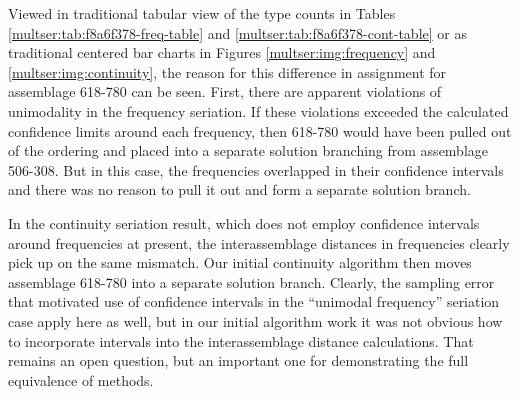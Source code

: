 Viewed in traditional tabular view of the type counts in Tables
\ref{multser:tab:f8a6f378-freq-table} and \ref{multser:tab:f8a6f378-cont-table} or as
traditional centered bar charts in Figures \ref{multser:img:frequency} and
\ref{multser:img:continuity}, the reason for this difference in assignment for assemblage 618-780 can be seen. First, there are
apparent violations of unimodality in the frequency seriation.  If these violations exceeded the calculated confidence limits around each frequency, then 618-780 would have been pulled out of the ordering and placed into a separate solution branching from assemblage 506-308.  But in this case, the frequencies overlapped in their confidence intervals and there was no reason to pull it out and form a separate solution branch.

In the continuity seriation result, which does not employ confidence intervals around frequencies at present, the interassemblage distances in frequencies clearly pick up on the same mismatch.  Our initial continuity algorithm then moves assemblage 618-780 into a separate solution branch.   Clearly, the sampling error that motivated use of confidence intervals in the ``unimodal frequency'' seriation case apply here as well, but in our initial algorithm work it was not obvious how to incorporate intervals into the interassemblage distance calculations.  That remains an open question, but an important one for demonstrating the full equivalence of methods.



